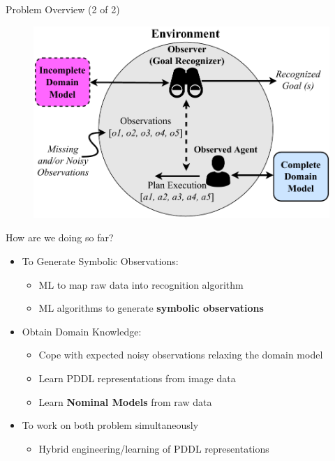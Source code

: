 \documentclass[usenames,dvipsnames]{beamer}
\begin{document}
    \begin{frame}{Problem Overview (2 of 2)}
		\begin{figure}[]
		 	\centering
		 	\includegraphics[width=0.9\linewidth]{fig/GoalRecognition-IncompleteDomains-Big.pdf}
		\end{figure}
    \end{frame}

\begin{frame}[c]{How are we doing so far?}
	\begin{itemize}
		\item To Generate Symbolic Observations:
		\begin{itemize}
			\item ML to map raw data into recognition algorithm {\Large \checkmark}
			\item ML algorithms to generate \textbf{symbolic observations}
		\end{itemize}
		\item Obtain Domain Knowledge:
		\begin{itemize}
			\item Cope with expected noisy observations relaxing the domain model {\Large \color{red} \checkmark}
			\item Learn PDDL representations from image data
			\item Learn \textbf{Nominal Models} from raw data
		\end{itemize}
		\item To work on both problem simultaneously
		\begin{itemize}
			\item Hybrid engineering/learning of PDDL representations 
		\end{itemize}
	\end{itemize}
\end{frame}
\end{document}
